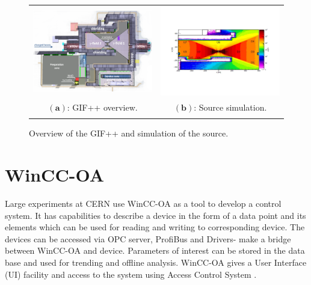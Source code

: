 \documentclass[a4paper,11pt]{article}
\begin{document}
\begin{figure}[htp]
\centering
\begin{tabular}{cc}
\hspace{-0.5cm}
\includegraphics[scale=0.2]{images/GIF.png}
& \hspace{0.1cm} \includegraphics[scale=0.4,trim=60 130 60 130,clip]{images/simulation.jpg}\\
   $(\mathbf{a})$: GIF++ overview.\qquad\qquad&$(\mathbf{b})$: Source simulation.\\ \\
  \end{tabular}
\caption{Overview of the GIF++ and simulation of the source.}
\label{gif}
\end{figure}

\section{WinCC-OA}Large experiments at CERN use WinCC-OA as a tool to develop a control system. It has capabilities to describe a device in the form of a data point and its elements which can be used for reading and writing to corresponding device. The devices can be accessed via OPC server, ProfiBus and Drivers- make a bridge between WinCC-OA and device. Parameters of interest can be stored in the data base and used for trending and offline analysis. WinCC-OA gives a User Interface (UI) facility and access to the system using Access Control System \cite{wincc-oa}.
\end{document}
